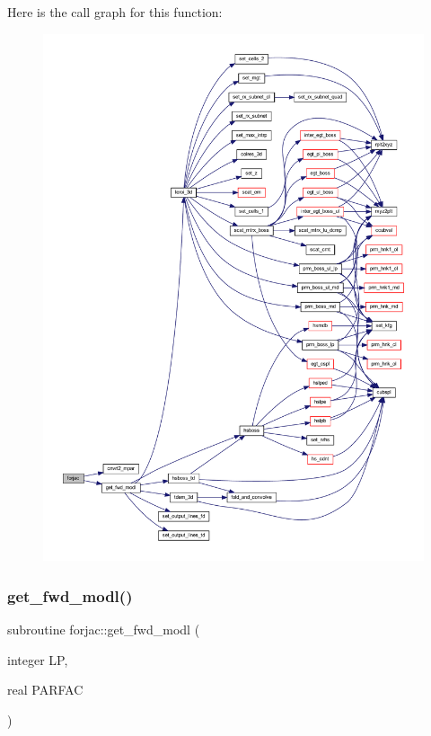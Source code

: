 Here is the call graph for this function\+:\nopagebreak
\begin{figure}[H]
\begin{center}
\leavevmode
\includegraphics[width=350pt]{Leroi__c_8f90_a2ce05aab7ca8a8111b718d33c0f7029c_cgraph}
\end{center}
\end{figure}
\mbox{\label{Leroi__c_8f90_a38a723748e0c805e5dfbd851b9c62b3e}} 
\subsubsection{\texorpdfstring{get\+\_\+fwd\+\_\+modl()}{get\_fwd\_modl()}}
{\footnotesize\ttfamily subroutine forjac\+::get\+\_\+fwd\+\_\+modl (\begin{DoxyParamCaption}\item[{integer}]{LP,  }\item[{real}]{P\+A\+R\+F\+AC }\end{DoxyParamCaption})}


